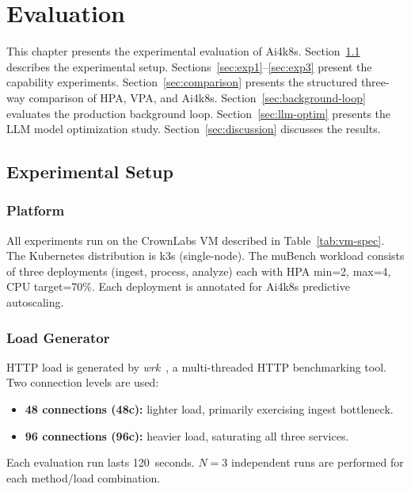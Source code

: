 \chapter{Evaluation}
\label{ch:evaluation}

This chapter presents the experimental evaluation of Ai4k8s. Section~\ref{sec:eval-setup}
describes the experimental setup. Sections~\ref{sec:exp1}--\ref{sec:exp3}
present the capability experiments. Section~\ref{sec:comparison} presents
the structured three-way comparison of HPA, VPA, and Ai4k8s.
Section~\ref{sec:background-loop} evaluates the production background loop.
Section~\ref{sec:llm-optim} presents the LLM model optimization study.
Section~\ref{sec:discussion} discusses the results.

\section{Experimental Setup}
\label{sec:eval-setup}

\subsection{Platform}
All experiments run on the CrownLabs VM described in Table~\ref{tab:vm-spec}.
The Kubernetes distribution is k3s (single-node). The muBench workload consists
of three deployments (ingest, process, analyze) each with HPA min=2, max=4,
CPU target=70\%. Each deployment is annotated for Ai4k8s predictive autoscaling.

\subsection{Load Generator}
HTTP load is generated by \textit{wrk}~\cite{wrk2012}, a multi-threaded HTTP
benchmarking tool. Two connection levels are used:
\begin{itemize}
  \item \textbf{48 connections (48c):} lighter load, primarily exercising
  ingest bottleneck.
  \item \textbf{96 connections (96c):} heavier load, saturating all three
  services.
\end{itemize}
Each evaluation run lasts 120~seconds. $N=3$ independent runs are performed
for each method/load combination.

